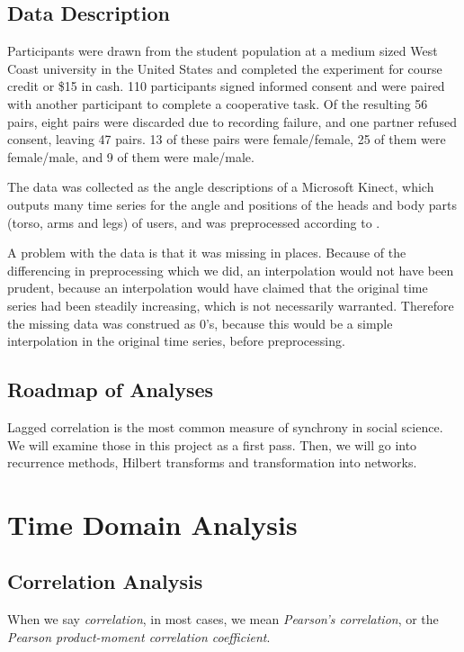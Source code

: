 \documentclass[12pt]{article}
\begin{document}
\subsection{Data Description}

Participants were drawn from the student population at a medium sized West Coast university in the United States and completed the experiment for course credit or \$15 in cash. 110 participants signed informed consent and were paired with another participant to complete a cooperative task.  Of the resulting 56 pairs, eight pairs were discarded due to recording failure, and one partner refused consent, leaving 47 pairs. 13 of these pairs were female/female, 25 of them were female/male, and 9 of them were male/male.

The data was collected as the angle descriptions of a Microsoft Kinect, which outputs many time series for the angle and positions of the heads and body parts (torso, arms and legs) of users, and was preprocessed according to \cite{andrea}.

A problem with the data is that it was missing in places. Because of the differencing in preprocessing which we did, an interpolation would not have been prudent, because an interpolation would have claimed that the original time series had been steadily increasing, which is not necessarily warranted. Therefore the missing data was construed as 0's, because this would be a simple interpolation in the original time series, before preprocessing.

\subsection{Roadmap of Analyses}

Lagged correlation is the most common measure of synchrony in social science. We will examine those in this project as a first pass. Then, we will go into recurrence methods, Hilbert transforms and transformation into networks. %

\section{Time Domain Analysis}

\subsection{Correlation Analysis}

When we say \emph{correlation}, in most cases, we mean \emph{Pearson's correlation}, or the \emph{Pearson product-moment correlation coefficient}.
\end{document}
